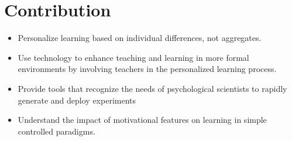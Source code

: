 \documentclass[12pt,a4paper,titlepage]{scrreprt}
\begin{document}
\chapter{Contribution}
\begin{itemize}
\item Personalize learning based on individual differences, not aggregates.
\item Use technology to enhance teaching and learning in more formal environments by involving teachers in the personalized learning process.
\item Provide tools that recognize the needs of psychological scientists to rapidly generate and deploy experiments
\item Understand the impact of motivational features on learning in simple controlled paradigms.
\end{itemize}
\printbibliography
\end{document}
